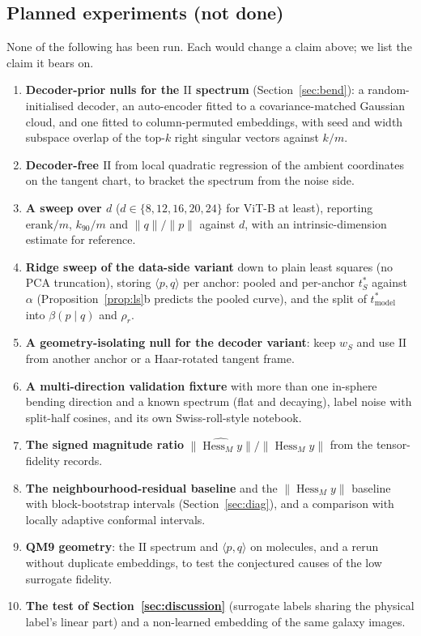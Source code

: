 \documentclass[10pt]{article}
\newcommand{\norm}[1]{\lVert #1 \rVert}
\newcommand{\II}{\mathrm{II}}
\newcommand{\Hess}{\operatorname{Hess}_M}
\newcommand{\tmodel}{t^*_{\mathrm{model}}}
\begin{document}
\subsection{Planned experiments (not done)}
\label{sec:planned}

None of the following has been run. Each would change a claim above; we list the claim it bears on.
\begin{enumerate}
\item \textbf{Decoder-prior nulls for the $\II$ spectrum} (Section~\ref{sec:bend}): a random-initialised decoder, an auto-encoder fitted to a covariance-matched Gaussian cloud, and one fitted to column-permuted embeddings, with seed and width subspace overlap of the top-$k$ right singular vectors against $k/m$.
\item \textbf{Decoder-free $\II$} from local quadratic regression of the ambient coordinates on the tangent chart, to bracket the spectrum from the noise side.
\item \textbf{A sweep over $d$} ($d\in\{8,12,16,20,24\}$ for ViT-B at least), reporting $\mathrm{erank}/m$, $k_{90}/m$ and $\norm{q}/\norm{p}$ against $d$, with an intrinsic-dimension estimate for reference.
\item \textbf{Ridge sweep of the data-side variant} down to plain least squares (no PCA truncation), storing $\langle p,q\rangle$ per anchor: pooled and per-anchor $t^*_S$ against $\alpha$ (Proposition~\ref{prop:ls}b predicts the pooled curve), and the split of $\tmodel$ into $\beta(p\mid q)$ and $\rho_r$.
\item \textbf{A geometry-isolating null for the decoder variant}: keep $w_S$ and use $\II$ from another anchor or a Haar-rotated tangent frame.
\item \textbf{A multi-direction validation fixture} with more than one in-sphere bending direction and a known spectrum (flat and decaying), label noise with split-half cosines, and its own Swiss-roll-style notebook.
\item \textbf{The signed magnitude ratio} $\norm{\widehat{\Hess y}}/\norm{\Hess y}$ from the tensor-fidelity records.
\item \textbf{The neighbourhood-residual baseline} and the $\norm{\Hess y}$ baseline with block-bootstrap intervals (Section~\ref{sec:diag}), and a comparison with locally adaptive conformal intervals.
\item \textbf{QM9 geometry}: the $\II$ spectrum and $\langle p,q\rangle$ on molecules, and a rerun without duplicate embeddings, to test the conjectured causes of the low surrogate fidelity.
\item \textbf{The test of Section~\ref{sec:discussion}} (surrogate labels sharing the physical label's linear part) and a non-learned embedding of the same galaxy images.
\end{enumerate}
\end{document}
